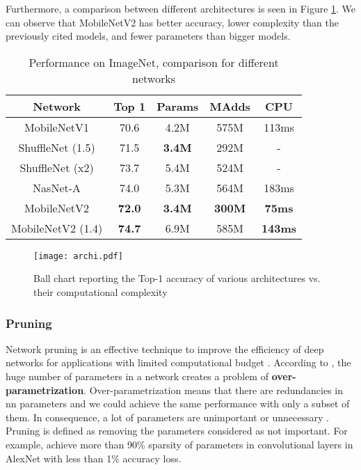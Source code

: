 Furthermore, a comparison between different architectures is seen in Figure \ref{fig:archi}. We can observe that MobileNetV2 has better accuracy, lower complexity than the previously cited models, and fewer parameters than bigger models.
%
\begin{table}
    \center
    \begin{tabular}{ | c | c | c c | c| }
        \hline \hline
        Network & Top 1 & Params & MAdds & CPU \\
        \hline \hline
        MobileNetV1 & 70.6 & 4.2M & 575M & 113ms \\
        ShuffleNet (1.5) & 71.5 & \textbf{3.4M} & 292M & - \\
        ShuffleNet (x2)  & 73.7 & 5.4M & 524M & - \\
        NasNet-A & 74.0 & 5.3M & 564M & 183ms \\
        \hline
        MobileNetV2 & \textbf{72.0} & \textbf{3.4M} & \textbf{300M} & \textbf{75ms} \\
        MobileNetV2 (1.4) & \textbf{74.7} & 6.9M & 585M & \textbf{143ms} \\
        \hline \hline
    \end{tabular}
    \caption{Performance on ImageNet, comparison for different networks \cite{sandler_mobilenetv2_2019}}
    \label{tab:mbv2}
\end{table}
%
\begin{figure}
    \centering
    \texttt{[image: archi.pdf]}
    \caption{Ball chart reporting the Top-1 accuracy of various architectures vs. their computational complexity \cite{canziani_analysis_2017}}
    \label{fig:archi}
\end{figure}
%
\subsubsection{Pruning} \label{subs:pruning}
Network pruning is an effective technique to improve the efficiency of deep networks for applications with limited computational budget \cite{liu_rethinking_2019}. According to \textcite{denton_exploiting_2014, liu_rethinking_2019}, the huge number of parameters in a network creates a problem of \textbf{over-parametrization}. Over-parametrization means that there are redundancies in \acrshort{nn} parameters and we could achieve the same performance with only a subset of them. In consequence, a lot of parameters are unimportant or unnecessary \cite{cheng_recent_2018}. Pruning is defined as removing the parameters considered as not important. For example, \textcite{baoyuan_liu_sparse_2015} achieve more than 90\% sparsity of parameters in convolutional layers in AlexNet with less than 1\% accuracy loss.

